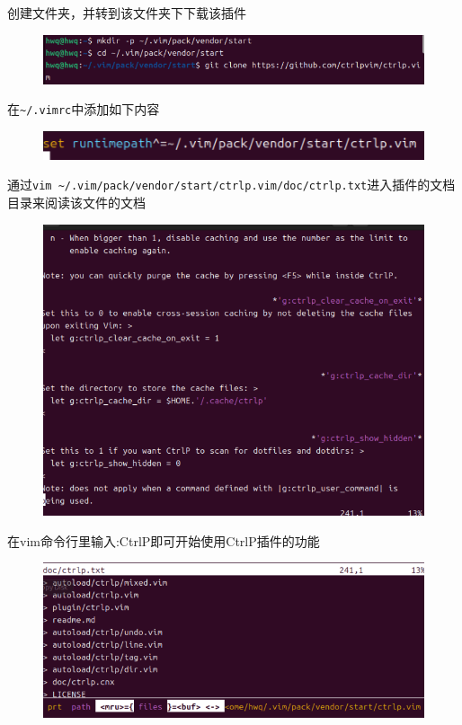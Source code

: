 \documentclass[a4paper, 12pt]{article}
\begin{document}
 创建文件夹，并转到该文件夹下下载该插件
\begin{figure}[H]
    \centering
    \includegraphics[width=1\linewidth]{vim6.png}
\end{figure}
在\verb|~/.vimrc|中添加如下内容
\begin{figure}[H]
    \centering
    \includegraphics[width=1\linewidth]{vim4.png}
\end{figure}
通过\verb|vim ~/.vim/pack/vendor/start/ctrlp.vim/doc/ctrlp.txt|进入插件的文档目录来阅读该文件的文档
\begin{figure}[H]
    \centering
    \includegraphics[width=1\linewidth]{vim1.png}
\end{figure}
在vim命令行里输入:CtrlP即可开始使用CtrlP插件的功能
\begin{figure}[H]
    \centering
    \includegraphics[width=1\linewidth]{vim2.png}
\end{figure}
\end{document}
